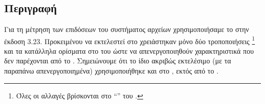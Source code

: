 \section{}
\subsection{Περιγραφή}
Για τη μέτρηση των επιδόσεων του συστήματος αρχείων χρησιμοποιήσαμε το
 \cite{fio} στην έκδοση 3.23. Προκειμένου να
εκτελεστεί στο \osv{} χρειάστηκαν μόνο δύο τροποποιήσεις%
\footnote{Όλες οι αλλαγές βρίσκονται στο ``''  του .}
και τα κατάλληλα ορίσματα στο  του  ώστε να
απενεργοποιηθούν χαρακτηριστικά που δεν παρέχονται από το \osv{}. Σημειώνουμε
ότι το ίδιο ακριβώς εκτελέσιμο (με τα παραπάνω απενεργοποιημένα) χρησιμοποιήθηκε
και στο \linux{}, εκτός από το \osv{}.

